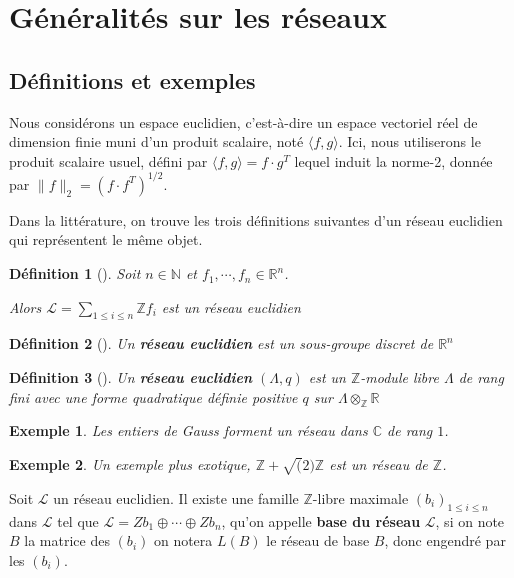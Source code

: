 \documentclass[a4paper,12pt]{report}  %
\theoremstyle{definitionstyle}
\newtheorem{definition}{Définition}[chapter] %
\theoremstyle{examplestyle}
\newtheorem{example}{Exemple}[chapter] %
\theoremstyle{remarkstyle}
\theoremstyle{propositionstyle}
\theoremstyle{theoremstyle}
\theoremstyle{proofstyle}
\begin{document}
\section{Généralités sur les réseaux}
		
\subsection{Définitions et exemples}
Nous considérons un espace euclidien, c'est-à-dire un espace vectoriel réel de dimension finie muni d'un produit scalaire, noté $\langle f, g \rangle$. Ici, nous utiliserons le produit scalaire usuel, défini par $\langle f, g \rangle = f \cdot g^T$ lequel induit la norme-2, donnée par $\|f\|_2=(f \cdot f^T)^{1/2}$.
	
	
Dans la littérature, on trouve les trois définitions suivantes d’un réseau euclidien qui représentent le même objet.
	
\begin{definition}[\cite{MCA}]
	Soit $n \in \mathbb{N}$ et $f_1, \cdots, f_n \in \mathbb{R}^n$.
		
	Alors $\mathcal{L} = \sum_{1 \leq i \leq n} \mathbb{Z} f_i$ est un réseau euclidien
\end{definition}

\begin{definition}[\cite{Wallet}]
	Un \textbf{réseau euclidien} est un sous-groupe discret de $\mathbb{R}^n$
\end{definition}

\begin{definition}[\cite{clef_unique_2}]
	Un \textbf{réseau euclidien} $(\Lambda, q)$ est un $\mathbb{Z}$-module libre $\Lambda$ de rang fini avec une forme quadratique définie positive $q$ sur $\Lambda \otimes_\mathbb{Z} \mathbb{R}$ 
\end{definition}

\begin{example}
	Les entiers de Gauss forment un réseau dans $\mathbb{C}$ de rang $1$.
\end{example}

\begin{example}
	Un exemple plus exotique, $\mathbb{Z} + \sqrt(2) \mathbb{Z}$ est un réseau de $\mathbb{Z}$.
\end{example}
	
Soit $\mathcal{L}$ un réseau euclidien. Il existe une famille $\mathbb{Z}$-libre maximale $(b_i)_{1 \leq i \leq n}$ dans $\mathcal{L}$ tel que $\mathcal{L} = Zb_1 \oplus \cdots \oplus Zb_n$, qu'on appelle \textbf{base du réseau} $\mathcal{L}$, si on note $B$ la matrice des $(b_i)$ on notera $L(B)$ le réseau de base $B$, donc engendré par les $(b_i)$.
	
\end{document}
